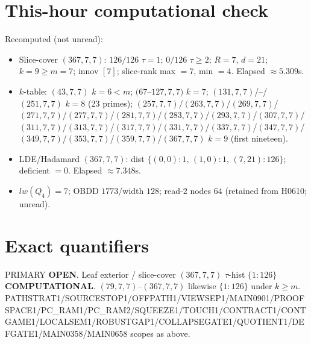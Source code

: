 \documentclass[11pt]{article}
\begin{document}
\section*{This-hour computational check}
Recomputed (not unread):
\begin{itemize}
\item Slice-cover $(367,7,7)$: $126/126$ $\tau{=}1$; $0/126$ $\tau{\ge}2$; $R{=}7$, $d{=}21$;
  $k{=}9{\ge}m{=}7$; innov $[7]$; slice-rank max $=7$, min $=4$. Elapsed $\approx5.309$s.
\item $k$-table: $(43,7,7)$ $k{=}6{<}m$; $(67$--$127,7,7)$ $k{=}7$;
  $(131,7,7)$/--/$(251,7,7)$ $k{=}8$ (23 primes); $(257,7,7)$/$(263,7,7)$/$(269,7,7)$/$(271,7,7)$/$(277,7,7)$/$(281,7,7)$/$(283,7,7)$/$(293,7,7)$/$(307,7,7)$/$(311,7,7)$/$(313,7,7)$/$(317,7,7)$/$(331,7,7)$/$(337,7,7)$/$(347,7,7)$/$(349,7,7)$/$(353,7,7)$/$(359,7,7)$/$(367,7,7)$ $k{=}9$ (first nineteen).
\item LDE/Hadamard $(367,7,7)$: dist $\{(0,0){:}1,\,(1,0){:}1,\,(7,21){:}126\}$; deficient $=0$. Elapsed $\approx7.348$s.
\item $lw(Q_4)=7$; OBDD $1773$/width $128$; read-$2$ nodes $64$ (retained from H0610; unread).
\end{itemize}

\section*{Exact quantifiers}
PRIMARY \textbf{OPEN}. Leaf exterior / slice-cover $(367,7,7)$ $\tau$-hist $\{1{:}126\}$ \textbf{COMPUTATIONAL}.
$(79,7,7)$--$(367,7,7)$ likewise $\{1{:}126\}$ under $k{\ge}m$.
PATHSTRAT1/SOURCESTOP1/OFFPATH1/VIEWSEP1/MAIN0901/PROOFSPACE1/PC\_RAM1/PC\_RAM2/SQUEEZE1/TOUCH1/CONTRACT1/CONTGAME1/LOCALSEM1/ROBUSTGAP1/COLLAPSEGATE1/QUOTIENT1/DEFGATE1/MAIN0358/MAIN0658 scopes as above.
\end{document}
